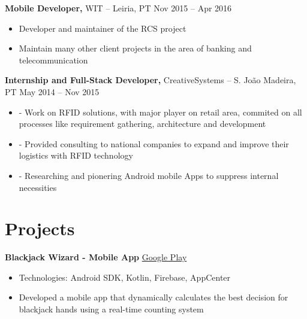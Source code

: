 \documentclass[11pt]{article}       %
\begin{document}
\textbf{Mobile Developer,} {WIT} -- Leiria, PT \hfill Nov 2015 -- Apr 2016 \\
\vspace{-9pt}
\begin{itemize}
  \item Developer and maintainer of the RCS project
  \item Maintain many other client projects in the area of banking and telecommunication
\end{itemize}

\textbf{Internship and Full-Stack Developer,} {CreativeSystems} -- S. João Madeira, PT \hfill May 2014 -- Nov 2015 \\
\vspace{-9pt}
\begin{itemize}
  \item - Work on RFID solutions, with major player on retail area, commited on all processes like requirement gathering, architecture and development
  \item - Provided consulting to national companies to expand and improve their logistics with RFID technology
  \item - Researching and pionering Android mobile Apps to suppress internal necessities
\end{itemize}


\vspace{-18.5pt}

\section*{Projects}
\textbf{Blackjack Wizard - Mobile App} \hfill \href{https://play.google.com/store/apps/details?id=pt.psilva.blackjackwizard.demo&pcampaignid=web_share}{Google Play} \\
\vspace{-9pt}
\begin{itemize}
  \item Technologies: Android SDK, Kotlin, Firebase, AppCenter
  \item Developed a mobile app that dynamically calculates the best decision for blackjack hands using a real-time counting system
\end{itemize}
\end{document}
